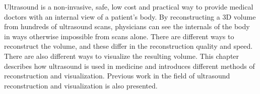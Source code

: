 Ultrasound is a non-invasive, safe, low cost and practical way to provide medical doctors with an internal view of a patient's body. By reconstructing a 3D volume from hundreds of ultrasound scans, physicians can see the internals of the body in ways otherwise impossible from scans alone. There are different ways to reconstruct the volume, and these differ in the reconstruction quality and speed. There are also different ways to visualize the resulting volume. This chapter describes how ultrasound is used in medicine and introduces different methods of reconstruction and visualization. Previous work in the field of ultrasound reconstruction and visualization is also presented.